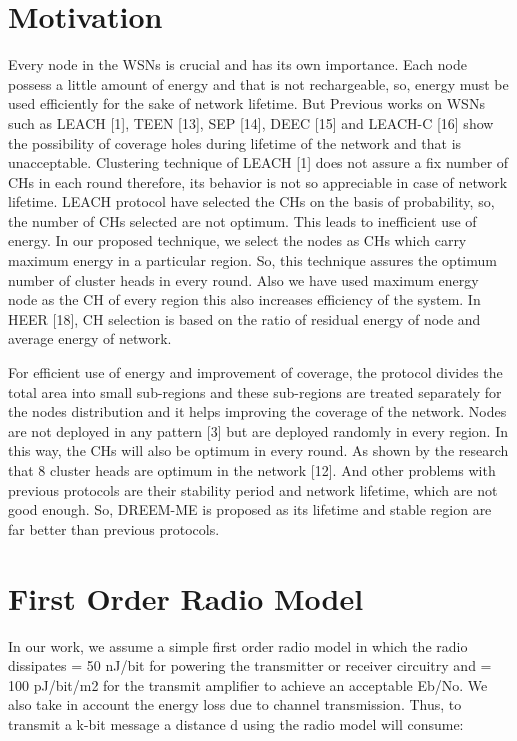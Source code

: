 \documentclass[journal]{IEEEtran}
\begin{document}
\section{Motivation}
Every node in the WSNs is crucial and has its own importance. Each node possess a little amount of energy and that is not rechargeable, so, energy must be used efficiently for the sake of network lifetime. But Previous works on WSNs such as LEACH [1], TEEN [13], SEP [14], DEEC [15] and LEACH-C [16] show the possibility of coverage holes during lifetime of the network and that is unacceptable. Clustering technique of LEACH [1] does not assure a fix number of CHs in each round therefore, its behavior is not so appreciable in case of network lifetime. LEACH protocol have selected the CHs on the basis of probability, so, the number of CHs selected are not optimum. This leads to inefficient use of energy. In our proposed technique, we select the nodes as CHs which carry maximum energy in a particular region. So, this technique assures the optimum number of cluster heads in every round. Also we have used maximum energy node as the CH of every region this also increases efficiency of the system. In HEER [18], CH selection is based on the ratio of residual energy of node and average energy of network.

For efficient use of energy and improvement of coverage, the protocol divides the total area into small sub-regions and these sub-regions are treated separately for the nodes distribution and it helps improving the coverage of the network. Nodes are not deployed in any pattern [3] but are deployed randomly in every region. In this way, the CHs will also be optimum in every round. As shown by the research that 8 cluster heads are optimum in the network [12]. And other problems with previous protocols are their stability period and network lifetime, which are not good enough. So, DREEM-ME is proposed as its lifetime and stable region are far better than previous protocols.

\section{First Order Radio Model}
 In our work, we assume a simple first order radio model in which the radio dissipates  = 50 nJ/bit for powering the transmitter or receiver circuitry and  = 100 pJ/bit/m2 for the transmit amplifier to achieve an acceptable Eb/No. We also take in account the  energy loss due to channel transmission. Thus, to transmit a k-bit message a distance d using the radio model will consume:
\end{document}

